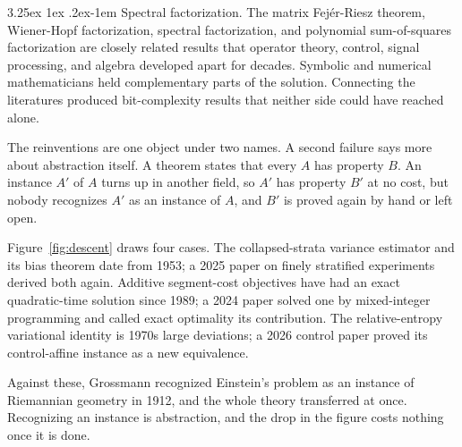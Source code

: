 \documentclass[11pt]{article}
\makeatletter
\renewcommand\paragraph{\@startsection{paragraph}{4}{\z@}%
  {3.25ex \@plus1ex \@minus.2ex}{-1em}%
  {\normalfont\normalsize\itshape}}
\theoremstyle{definition}
\theoremstyle{remark}
\makeatother
\begin{document}
\paragraph{Spectral factorization.} The matrix Fej\'er-Riesz theorem, Wiener-Hopf factorization, spectral factorization, and polynomial sum-of-squares factorization are closely related results that operator theory, control, signal processing, and algebra developed apart for decades. Symbolic and numerical mathematicians held complementary parts of the solution. Connecting the literatures produced bit-complexity results that neither side could have reached alone.

The reinventions are one object under two names. A second failure says more about abstraction itself. A theorem states that every $A$ has property $B$. An instance $A'$ of $A$ turns up in another field, so $A'$ has property $B'$ at no cost, but nobody recognizes $A'$ as an instance of $A$, and $B'$ is proved again by hand or left open.

Figure~\ref{fig:descent} draws four cases. The collapsed-strata variance estimator and its bias theorem date from 1953; a 2025 paper on finely stratified experiments derived both again. Additive segment-cost objectives have had an exact quadratic-time solution since 1989; a 2024 paper solved one by mixed-integer programming and called exact optimality its contribution. The relative-entropy variational identity is 1970s large deviations; a 2026 control paper proved its control-affine instance as a new equivalence.

Against these, Grossmann recognized Einstein's problem as an instance of Riemannian geometry in 1912, and the whole theory transferred at once. Recognizing an instance is abstraction, and the drop in the figure costs nothing once it is done.
\end{document}
